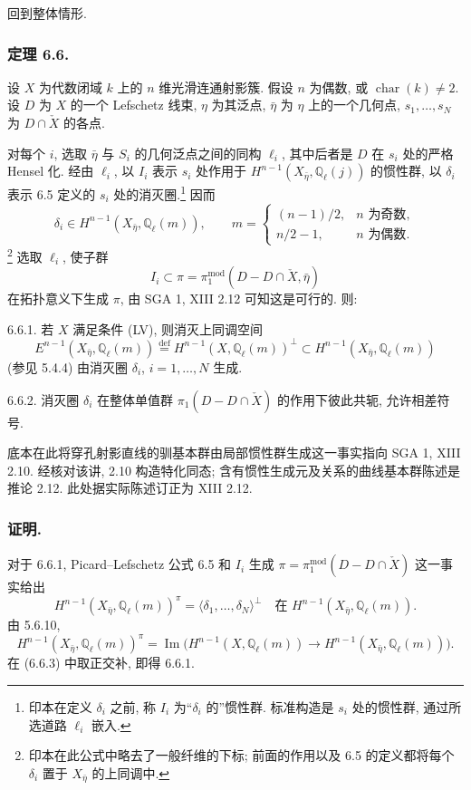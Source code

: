 回到整体情形.

\subsubsection*{定理 6.6.}
设 $X$ 为代数闭域 $k$ 上的 $n$ 维光滑连通射影簇. 假设 $n$ 为偶数, 或 $\operatorname{char}(k)\ne2$. 设 $D$ 为 $X$ 的一个 Lefschetz 线束, $\eta$ 为其泛点, $\bar\eta$ 为 $\eta$ 上的一个几何点, $s_1,\ldots,s_N$ 为 $D\cap\check X$ 的各点.

对每个 $i$, 选取 $\bar\eta$ 与 $S_i$ 的几何泛点之间的同构 $\ell_i$, 其中后者是 $D$ 在 $s_i$ 处的严格 Hensel 化. 经由 $\ell_i$, 以 $I_i$ 表示 $s_i$ 处作用于 $H^{n-1}(X_{\bar\eta},\mathbb Q_\ell(j))$ 的惯性群, 以 $\delta_i$ 表示 6.5 定义的 $s_i$ 处的消灭圈.\footnote{印本在定义 $\delta_i$ 之前, 称 $I_i$ 为“$\delta_i$ 的”惯性群. 标准构造是 $s_i$ 处的惯性群, 通过所选道路 $\ell_i$ 嵌入.}
因而
\[
\delta_i\in H^{n-1}(X_{\bar\eta},\mathbb Q_\ell(m)),
\qquad
m=\begin{cases}
(n-1)/2,& n\text{ 为奇数},\\
n/2-1,& n\text{ 为偶数}.
\end{cases}
\]
\footnote{印本在此公式中略去了一般纤维的下标; 前面的作用以及 6.5 的定义都将每个 $\delta_i$ 置于 $X_{\bar\eta}$ 的上同调中.}
选取 $\ell_i$, 使子群
\[
I_i\subset
\pi=\pi_1^{\mathrm{mod}}(D-D\cap\check X,\bar\eta)
\]
在拓扑意义下生成 $\pi$, 由 SGA 1, XIII 2.12 可知这是可行的. 则:

\medskip
\noindent
\textup{6.6.1.} 若 $X$ 满足条件 (LV), 则消灭上同调空间
\[
E^{n-1}(X_{\bar\eta},\mathbb Q_\ell(m))
\stackrel{\mathrm{def}}{=}
H^{n-1}(X,\mathbb Q_\ell(m))^\perp
\subset H^{n-1}(X_{\bar\eta},\mathbb Q_\ell(m))
\]
(参见 5.4.4) 由消灭圈 $\delta_i$, $i=1,\ldots,N$ 生成.

\medskip
\noindent
\textup{6.6.2.} 消灭圈 $\delta_i$ 在整体单值群 $\pi_1(D-D\cap\check X)$ 的作用下彼此共轭, 允许相差符号.

\begin{editorialnote}
底本在此将穿孔射影直线的驯基本群由局部惯性群生成这一事实指向 SGA 1, XIII 2.10. 经核对该讲, 2.10 构造特化同态; 含有惯性生成元及关系的曲线基本群陈述是推论 2.12. 此处据实际陈述订正为 XIII 2.12.
\end{editorialnote}

\subsubsection*{证明.}
对于 6.6.1, Picard--Lefschetz 公式 6.5 和 $I_i$ 生成 $\pi=\pi_1^{\mathrm{mod}}(D-D\cap\check X)$ 这一事实给出
\begin{equation}\tag{6.6.3}
H^{n-1}(X_{\bar\eta},\mathbb Q_\ell(m))^\pi
=\bigl\langle\delta_1,\ldots,\delta_N\bigr\rangle^\perp
\quad\text{在 }H^{n-1}(X_{\bar\eta},\mathbb Q_\ell(m)).
\end{equation}
由 5.6.10,
\begin{equation}\tag{6.6.4}
H^{n-1}(X_{\bar\eta},\mathbb Q_\ell(m))^\pi
=\operatorname{Im}\bigl(
H^{n-1}(X,\mathbb Q_\ell(m))
\longrightarrow H^{n-1}(X_{\bar\eta},\mathbb Q_\ell(m))
\bigr).
\end{equation}
在 (6.6.3) 中取正交补, 即得 6.6.1.

